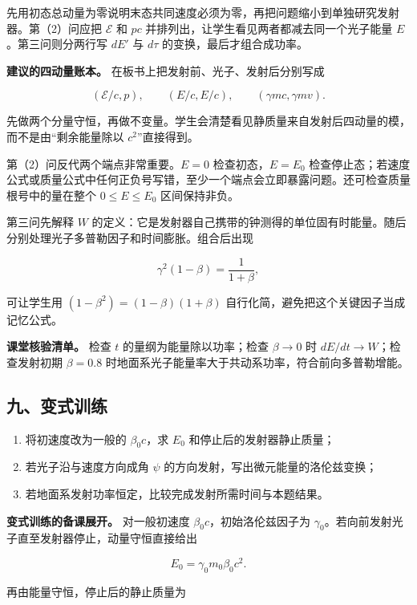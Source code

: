 \documentclass[12pt,a4paper,UTF8]{ctexart}
\newcommand{\tightlist}{\setlength{\itemsep}{0pt}\setlength{\parskip}{0pt}}
\begin{document}
先用初态总动量为零说明末态共同速度必须为零，再把问题缩小到单独研究发射器。第（2）问应把
\(\mathcal E\) 和 \(pc\) 并排列出，让学生看见两者都减去同一个光子能量
\(E\)。第三问则分两行写 \(dE'\) 与 \(d\tau\) 的变换，最后才组合成功率。

\textbf{建议的四动量账本。} 在板书上把发射前、光子、发射后分别写成

\[
(\mathcal E/c,p),
\qquad
(E/c,E/c),
\qquad
(\gamma mc,\gamma mv).
\]

先做两个分量守恒，再做不变量。学生会清楚看见静质量来自发射后四动量的模，而不是由``剩余能量除以
\(c^2\)''直接得到。

第（2）问反代两个端点非常重要。\(E=0\) 检查初态，\(E=E_0\)
检查停止态；若速度公式或质量公式中任何正负号写错，至少一个端点会立即暴露问题。还可检查质量根号中的量在整个
\(0\leq E\leq E_0\) 区间保持非负。

第三问先解释 \(W\)
的定义：它是发射器自己携带的钟测得的单位固有时能量。随后分别处理光子多普勒因子和时间膨胀。组合后出现

\[
\gamma^2(1-\beta)=\frac1{1+\beta},
\]

可让学生用 \((1-\beta^2)=(1-\beta)(1+\beta)\)
自行化简，避免把这个关键因子当成记忆公式。

\textbf{课堂核验清单。} 检查 \(t\) 的量纲为能量除以功率；检查
\(\beta\to0\) 时 \(dE/dt\to W\)；检查发射初期 \(\beta=0.8\)
时地面系光子能量率大于共动系功率，符合前向多普勒增能。

\subsection{九、变式训练}\label{ux4e5dux53d8ux5f0fux8badux7ec3-3}

\begin{enumerate}
\def\labelenumi{\arabic{enumi}.}
\tightlist
\item
  将初速度改为一般的 \(\beta_0c\)，求 \(E_0\) 和停止后的发射器静止质量；
\item
  若光子沿与速度方向成角 \(\psi\) 的方向发射，写出微元能量的洛伦兹变换；
\item
  若地面系发射功率恒定，比较完成发射所需时间与本题结果。
\end{enumerate}

\textbf{变式训练的备课展开。} 对一般初速度
\(\beta_0c\)，初始洛伦兹因子为
\(\gamma_0\)。若向前发射光子直至发射器停止，动量守恒直接给出

\[
E_0=\gamma_0m_0\beta_0c^2.
\]

再由能量守恒，停止后的静止质量为
\end{document}
